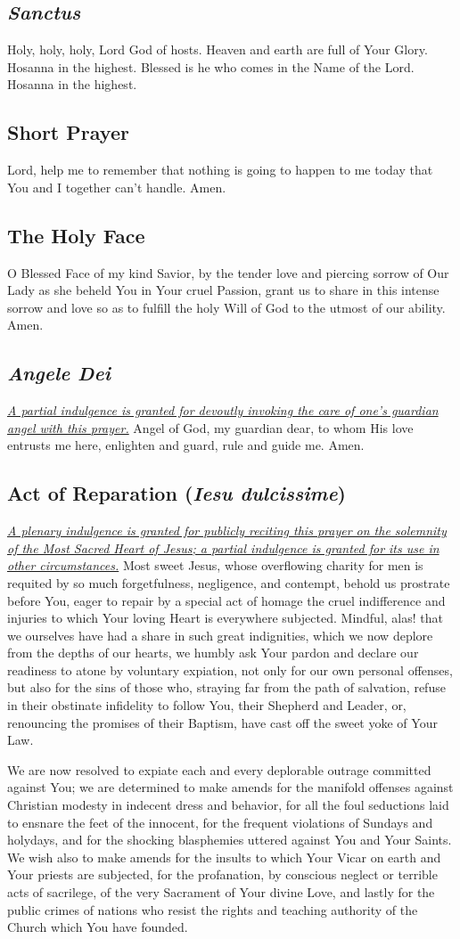 \documentclass[12pt]{article}
\newcommand{\prayertitle}[1]{\subsection{#1}}
\newcommand{\indulgencedprayertitle}[1]{\prayertitle{#1 \protect\kreuz}}
\newcommand{\emphasis}[1]{\emph{#1}}
\newcommand{\emphasis}[1]{\textsl{#1}}
\newcommand{\foreign}[1]{\emphasis{#1}}
\newcommand{\note}[1]{{\small{\emphasis{#1}}}\newline}
\newcommand{\linkednote}[2]{\hyperlink{#1}{\note{#2}}}
\begin{document}
\prayertitle{\foreign{Sanctus}}
\label{prayer:sanctus}
Holy, holy, holy, Lord God of hosts.
Heaven and earth are full of Your Glory.
Hosanna in the highest.
Blessed is he who comes in the Name of the Lord.
Hosanna in the highest.

\prayertitle{Short Prayer}
\label{prayer:short}
Lord, help me to remember that nothing is going to happen to me today that You and I together can't handle. Amen.

\prayertitle{The Holy Face}
\label{prayer:holy_face}
O Blessed Face of my kind Savior, by the tender love and piercing sorrow of Our Lady as she beheld You in Your cruel Passion, grant us to share in this intense sorrow and love
so as to fulfill the holy Will of God to the utmost of our ability.
Amen.

\indulgencedprayertitle{\foreign{Angele Dei}}
\linkednote{grant18}{A partial indulgence is granted for devoutly invoking the care of one's guardian angel with this prayer.}
Angel of God, my guardian dear, to whom His love entrusts me here, enlighten and guard, rule and guide me. Amen.

\indulgencedprayertitle{Act of Reparation (\foreign{Iesu dulcissime})}
\linkednote{grant3}{A plenary indulgence is granted for publicly reciting this prayer on the solemnity of the Most Sacred Heart of Jesus;
a partial indulgence is granted for its use in other circumstances.}
Most sweet Jesus, whose overflowing charity for men is requited by so much forgetfulness, negligence, and contempt, behold us prostrate before You, eager to repair by a special act of homage the cruel indifference and injuries to which Your loving Heart is everywhere subjected.
Mindful, alas! that we ourselves have had a share in such great indignities, which we now deplore from the depths of our hearts, we humbly ask Your pardon and declare our readiness to atone by voluntary expiation, not only for our own personal offenses, but also for the sins of those who, straying far from the path of salvation, refuse in their obstinate infidelity to follow You, their Shepherd and Leader, or, renouncing the promises of their Baptism, have cast off the sweet yoke of Your Law.

We are now resolved to expiate each and every deplorable outrage committed against You; we are determined to make amends for the manifold offenses against Christian modesty in indecent dress and behavior, for all the foul seductions laid to ensnare the feet of the innocent, for the frequent violations of Sundays and holydays, and for the shocking blasphemies uttered against You and Your Saints.
We wish also to make amends for the insults to which Your Vicar on earth and Your priests are subjected, for the profanation, by conscious neglect or terrible acts of sacrilege, of the very Sacrament of Your divine Love, and lastly for the public crimes of nations who
resist the rights and teaching authority of the Church which You have founded.
\end{document}
